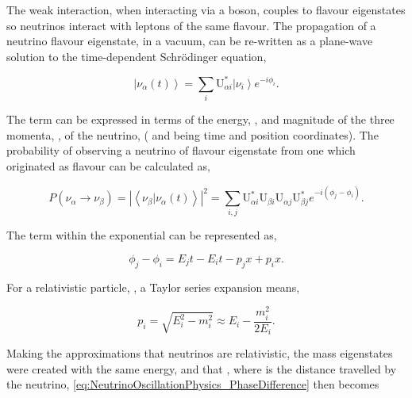 The weak interaction, when interacting via a  boson, couples to flavour eigenstates so neutrinos interact with leptons of the same flavour. The propagation of a neutrino flavour eigenstate, in a vacuum, can be re-written as a plane-wave solution to the time-dependent Schr{\"o}dinger equation,

\begin{equation}
  \label{eq:NeutrinoOscillationPhysics_TimeDepSuperposition}
  \left|\nu_{\alpha}(t)\right> = \sum_{i}\mathrm{U}^{*}_{\alpha i}\left|\nu_{i}\right>e^{-i \phi_{i}}.
\end{equation}

The  term can be expressed in terms of the energy, , and magnitude of the three momenta, , of the neutrino,  ( and  being time and position coordinates). The probability of observing a neutrino of flavour eigenstate \quickmath{\beta} from one which originated as flavour \quickmath{\alpha} can be calculated as,

\begin{equation}
  \label{eq:NeutrinoOscillationPhysics_ProbabilityComplexForm}
  P(\nu_{\alpha} \rightarrow \nu_{\beta}) = \left| \left< \nu_{\beta} | \nu_{\alpha}(t) \right> \right|^{2} = \sum_{i,j} \mathrm{U}^{*}_{\alpha i}\mathrm{U}_{\beta i}\mathrm{U}_{\alpha j}\mathrm{U}^{*}_{\beta j} e^{-i(\phi_{j}-\phi_{i})}.
\end{equation}

The term within the exponential can be represented as,

\begin{equation}
  \label{eq:NeutrinoOscillationPhysics_PhaseDifference}
  \phi_{j}-\phi_{i} = E_{j}t - E_{i}t - p_{j}x + p_{i}x .
\end{equation}

For a relativistic particle, , a Taylor series expansion means,

\begin{equation}
  p_{i} = \sqrt{E^{2}_{i} - m^{2}_{i}} \approx E_{i} - \frac{m^{2}_{i}}{2E_{i}}.
\end{equation}

Making the approximations that neutrinos are relativistic, the mass eigenstates were created with the same energy, and that , where  is the distance travelled by the neutrino, \autoref{eq:NeutrinoOscillationPhysics_PhaseDifference} then becomes

